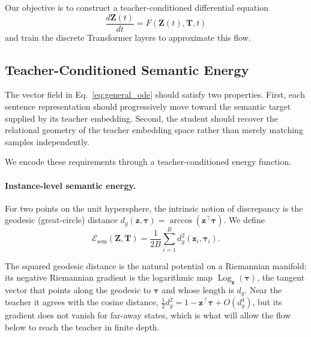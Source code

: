 \documentclass[11pt]{article}
\begin{document}
Our objective is to construct a teacher-conditioned differential equation
\begin{equation}
    \frac{d\mathbf{Z}(t)}{dt}
    =
    F\left(
        \mathbf{Z}(t),\mathbf{T},t
    \right)
    \label{eq:general_ode}
\end{equation}
and train the discrete Transformer layers to approximate this flow.


\subsection{Teacher-Conditioned Semantic Energy}\label{sec:energy}

The vector field in Eq.~\eqref{eq:general_ode} should satisfy two
properties. First, each sentence representation should progressively move
toward the semantic target supplied by its teacher embedding. Second, the
student should recover the relational geometry of the teacher embedding
space rather than merely matching samples independently.

We encode these requirements through a teacher-conditioned energy
function.

\paragraph{Instance-level semantic energy.}

For two points on the unit hypersphere, the intrinsic notion of discrepancy
is the geodesic (great-circle) distance
$d_g(\mathbf{z},\boldsymbol{\tau})=\arccos(\mathbf{z}^{\top}\boldsymbol{\tau})$.
We define
\begin{equation}
    \mathcal{E}_{\mathrm{sem}}(\mathbf{Z},\mathbf{T})
    =
    \frac{1}{2B}
    \sum_{i=1}^{B}
    d_g^2\left(\mathbf{z}_i,\boldsymbol{\tau}_i\right).
    \label{eq:semantic_energy}
\end{equation}

The squared geodesic distance is the natural potential on a Riemannian
manifold: its negative Riemannian gradient is the logarithmic map
$\operatorname{Log}_{\mathbf{z}}(\boldsymbol{\tau})$, the tangent vector
that points along the geodesic to $\boldsymbol{\tau}$ and whose length is
$d_g$. Near the teacher it agrees with the cosine distance,
$\tfrac12 d_g^2 = 1-\mathbf{z}^{\top}\boldsymbol{\tau}+O(d_g^4)$, but its
gradient does not vanish for far-away states, which is what will allow the
flow below to reach the teacher in finite depth.
\end{document}
